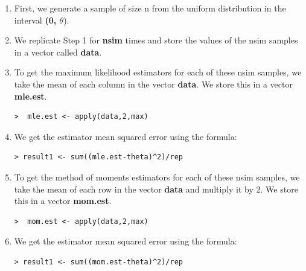 \documentclass[12pt,letterpaper,titlepage,en-US]{article}
\begin{document}
\begin{enumerate}
 
\item First, we generate a sample of size n from the uniform distribution in the interval \textbf{(0, $\theta$}). 

\item We replicate Step 1 for \textbf{nsim} times and store the values of the nsim samples in a vector called \textbf{data}.

\item To get the maximum likelihood estimators for each of these nsim samples, we take the mean of each column in the vector \textbf{data}. We store this in a vector \textbf{mle.est}. 

\begin{knitrout}
\color{fgcolor}
\begin{kframe}
\begin{verbatim}
>  mle.est <- apply(data,2,max)
\end{verbatim}
\end{kframe}
\end{knitrout}


\item We get the estimator mean squared error using the formula:

\begin{knitrout}
\color{fgcolor}
\begin{kframe}
\begin{verbatim}
> result1 <- sum((mle.est-theta)^2)/rep
\end{verbatim}
\end{kframe}
\end{knitrout}



\item To get the method of moments estimators for each of these nsim samples, we take the mean of each row in the vector \textbf{data} and multiply it by 2. We store this in a vector \textbf{mom.est}. 

\begin{knitrout}
\color{fgcolor}
\begin{kframe}
\begin{verbatim}
>  mom.est <- apply(data,2,max)
\end{verbatim}
\end{kframe}
\end{knitrout}


\item We get the estimator mean squared error using the formula:

\begin{knitrout}
\color{fgcolor}
\begin{kframe}
\begin{verbatim}
> result1 <- sum((mom.est-theta)^2)/rep
\end{verbatim}
\end{kframe}
\end{knitrout}
\end{enumerate}
\end{document}
